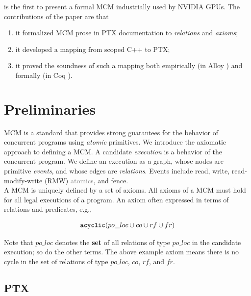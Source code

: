 \documentclass[11pt,a4paper]{article}
\begin{document}
\cite{10.1145/3297858.3304043} is the first to present a formal MCM industrially used by NVIDIA GPUs. The contributions of the paper are that

\begin{enumerate}
    \item it formalized MCM prose in PTX documentation to \textit{relations} and \textit{axioms};
    \item it developed a mapping from scoped C++ to PTX;
    \item it proved the soundness of such a mapping both empirically (in Alloy \cite{alloy}) and formally (in Coq \cite{coq}).
\end{enumerate}

\section{Preliminaries}

MCM is a standard that provides strong guarantees for the behavior of concurrent programs using \textit{atomic} primitives. We introduce the axiomatic approach to defining a MCM. A candidate \textit{execution} is a behavior of the concurrent program. We define an execution as a graph, whose nodes are primitive \textit{events}, and whose edges are \textit{relations}. Events include read, write, read-modify-write (RMW) \textcolor{gray}{atomics}, and fence.\\

A MCM is uniquely defined by a set of axioms. All axioms of a MCM must hold for all legal executions of a program. An axiom often expressed in terms of relations and predicates, e.g.,

$$
\verb|acyclic|(po\_loc \cup co \cup rf \cup fr)
$$

Note that $po\_loc$ denotes the \textbf{set} of all relations of type $po\_loc$ in the candidate execution; so do the other terms. The above example axiom means there is no cycle in the set of relations of type $po\_loc$, $co$, $rf$, and $fr$.

\subsection{PTX}
\end{document}

